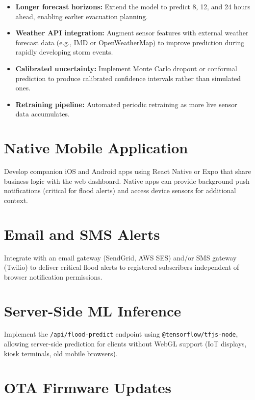 \begin{itemize}[leftmargin=1.5em]
  \item \textbf{Longer forecast horizons:} Extend the model to predict 8, 12, and 24 hours ahead, enabling earlier evacuation planning.
  \item \textbf{Weather API integration:} Augment sensor features with external weather forecast data (e.g., IMD or OpenWeatherMap) to improve prediction during rapidly developing storm events.
  \item \textbf{Calibrated uncertainty:} Implement Monte Carlo dropout or conformal prediction to produce calibrated confidence intervals rather than simulated ones.
  \item \textbf{Retraining pipeline:} Automated periodic retraining as more live sensor data accumulates.
\end{itemize}

\section{Native Mobile Application}

Develop companion iOS and Android apps using React Native or Expo that share business logic with the web dashboard. Native apps can provide background push notifications (critical for flood alerts) and access device sensors for additional context.

\section{Email and SMS Alerts}

Integrate with an email gateway (SendGrid, AWS SES) and/or SMS gateway (Twilio) to deliver critical flood alerts to registered subscribers independent of browser notification permissions.

\section{Server-Side ML Inference}

Implement the \texttt{/\allowbreak{}api/\allowbreak{}flood-predict} endpoint using \texttt{@tensorflow/\allowbreak{}tfjs-node}, allowing server-side prediction for clients without WebGL support (IoT displays, kiosk terminals, old mobile browsers).

\section{OTA Firmware Updates}

